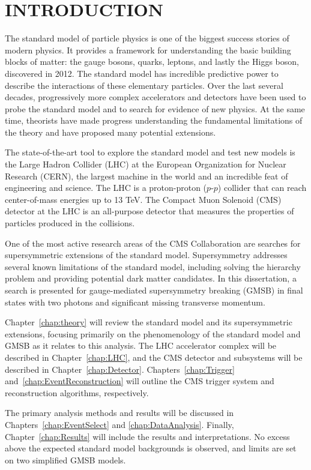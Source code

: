 \chapter{INTRODUCTION}

The standard model of particle physics is one of the biggest success stories of modern physics. It provides a framework for understanding the basic building blocks of matter: the gauge bosons, quarks, leptons, and lastly the Higgs boson, discovered in 2012. The standard model 
has incredible predictive power to describe the interactions of these elementary particles. Over the last several decades, progressively more complex accelerators and detectors have been used to probe the standard model and to search for evidence of new physics. At the same time, theorists have made progress understanding the fundamental limitations of the theory and have proposed many potential extensions.

The state-of-the-art tool to explore the standard model and test new models is the Large Hadron Collider (LHC) at the European Organization for Nuclear Research (CERN), the largest machine in the world and an incredible feat of engineering and science. The LHC is a proton-proton ($p$-$p$) collider that can reach center-of-mass energies up to 13 TeV. The Compact Muon Solenoid (CMS) detector at the LHC is an all-purpose detector that measures the properties of particles produced in the collisions. 

One of the most active research areas of the CMS Collaboration are searches for supersymmetric extensions of the standard model. Supersymmetry addresses several known limitations of the standard model, 
including solving the hierarchy problem and providing potential dark matter candidates. 
In this dissertation, a search is presented for gauge-mediated supersymmetry breaking (GMSB) 
in final states with two photons and significant missing transverse momentum. 

Chapter~\ref{chap:theory} will review the standard model and its supersymmetric extensions, focusing primarily on the phenomenology of the standard model and GMSB as it relates to this analysis. The LHC accelerator complex will be described in Chapter~\ref{chap:LHC}, and the 
CMS detector and subsystems will be described in Chapter~\ref{chap:Detector}. Chapters~\ref{chap:Trigger} and~\ref{chap:EventReconstruction} will outline the CMS trigger system and reconstruction algorithms, respectively. 

The primary analysis methods and results will be discussed in Chapters~\ref{chap:EventSelect} and \ref{chap:DataAnalysis}.
Finally, Chapter~\ref{chap:Results} will include the results and interpretations. No excess above the 
expected standard model backgrounds is observed, and limits are set on two simplified GMSB models.
